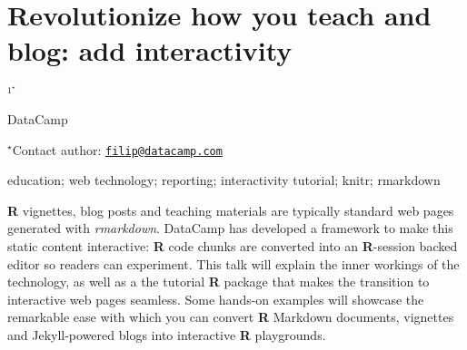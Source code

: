 \documentclass[\main/boa.tex]{subfiles}
\begin{document}
\section{Revolutionize how you teach and blog: add interactivity}

\begin{center}
  {\bf {}$^{1^\star}$}
\end{center}

\vskip 0.3cm

\begin{affiliations}
\begin{enumerate}
\begin{minipage}{0.915\textwidth}
\centering
\item DataCamp \\[-2pt]
\end{minipage}
\end{enumerate}
$^\star$Contact author: \href{mailto:filip@datacamp.com}{\nolinkurl{filip@datacamp.com}}\\
\end{affiliations}

\vskip 0.5cm

\begin{minipage}{0.915\textwidth}
\keywords education; web technology; reporting; interactivity
\packages tutorial; knitr; rmarkdown
\end{minipage}

\vskip 0.8cm

\textbf{R} vignettes, blog posts and teaching materials are typically
standard web pages generated with \emph{rmarkdown}. DataCamp has
developed a framework to make this static content interactive:
\textbf{R} code chunks are converted into an \textbf{R}-session backed
editor so readers can experiment. This talk will explain the inner
workings of the technology, as well as a the tutorial \textbf{R} package
that makes the transition to interactive web pages seamless. Some
hands-on examples will showcase the remarkable ease with which you can
convert \textbf{R} Markdown documents, vignettes and Jekyll-powered
blogs into interactive \textbf{R} playgrounds.
\end{document}
